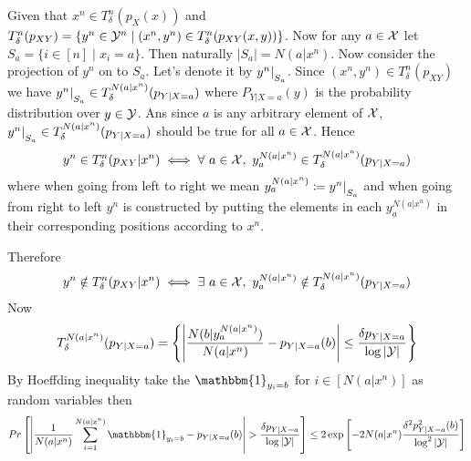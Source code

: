 \documentclass[a4paper, 11pt]{article}
\begin{document}
Given that $x^n\in T_{\delta}^n(p_{X}(x))$ and $T_{\delta}^n(p_{XY})=\{y^n\in \mathcal{Y}^n\mid (x^n,y^n)\in T_{\delta}^n(p_{XY}(x,y))\}$. Now for any $a\in \mathcal{X}$ let $S_a=\{i\in [n]\mid x_i=a\}$. Then naturally $|S_a|=N(a|x^n)$. Now consider the projection of $y^n$ on to $S_a$. Let's denote it by $y^n|\strut_{S_a}$. Since $(x^n,y^n)\in T_{\delta}^n(p_{XY})$ we have $y^n|\strut_{S_a}\in T_{\delta}^{N(a|x^n)}(p_{Y|X=a})$ where $P_{Y|X=a}(y)$ is the probability distribution over $y\in \mathcal{Y}$. Ans since $a$ is any arbitrary element of $\mathcal{X}$, $y^n|\strut_{S_a}\in T_{\delta}^{N(a|x^n)}(p_{Y|X=a})$ should be true for all $a\in \mathcal{X}$. Hence $$y^n\in T_{\delta}^n(p_{XY}|x^n)\iff \forall\ a\in \mathcal{X}, \ y^{N(a|x^n)}_a\in T_{\delta}^{N(a|x^n)}(p_{Y|X=a})$$where when going from left to right we mean $y^{N(a|x^n)}_a\coloneqq y^n|\strut_{S_a}$ and when going from right to left $y^n$ is constructed by putting the elements in each $y^{N(a|x^n)}_a$ in their corresponding positions according to $x^n$.

Therefore $$y^n\notin T_{\delta}^n(p_{XY}|x^n)\iff \exists\ a\in\mathcal{X},\ y^{N(a|x^n)}_a\notin T_{\delta}^{N(a|x^n)}(p_{Y|X=a})$$
Now $$ T_{\delta}^{N(a|x^n)}(p_{Y|X=a})=\left\{ \left|\frac{N(b|y^{N(a|x^n)}_a)}{N(a|x^n)}-p_{Y|X=a}(b)\right|\leq \frac{\delta p_{Y|X=a}}{\log |\mathcal{Y}|} \right\}$$
By Hoeffding inequality take the $\mathbbm{1}_{y_i=b}$ for $i\in [N(a|x^n)]$ as random variables then 
$$Pr\lt[ \lt| \frac1{N(a|x^n)}\sum_{i=1}^{N(a|x^n)}\mathbbm{1}_{y_i=b} -p_{Y|X=a}(b)\rt|>\frac{\delta p_{Y|X=a}}{\log |\mcY|} \rt]\leq 2\exp\lt[ -2N(a|x^n)\frac{\delta^2p_{Y|X=a}^2(b)}{\log^2|\mcY|} \rt]$$

	
\end{document}
